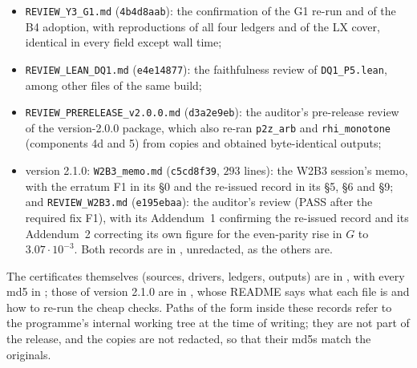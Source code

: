 \documentclass[11pt]{article}
\theoremstyle{definition}
\newcommand{\lean}[1]{\texttt{#1}}
\begin{document}
\begin{itemize}
\item \lean{REVIEW\_\allowbreak{}Y3\_\allowbreak{}G1.md} (\lean{4b4d8aab}): the confirmation of the G1 re-run and of the B4 adoption, with reproductions of all four ledgers and of the LX cover, identical in every field except wall time;
\item \lean{REVIEW\_\allowbreak{}LEAN\_\allowbreak{}DQ1.md} (\lean{e4e14877}): the faithfulness review of \lean{DQ1\_P5.lean}, among other files of the same build;
\item \lean{REVIEW\_\allowbreak{}PRERELEASE\_\allowbreak{}v2.0.0.md} (\lean{d3a2e9eb}): the auditor's pre-release review of the version-2.0.0 package, which also re-ran \lean{p2z\_arb} and \lean{rhi\_monotone} (components 4d and 5) from copies and obtained byte-identical outputs;
\item version 2.1.0: \lean{W2B3\_\allowbreak{}memo.md} (\lean{c5cd8f39}, $293$ lines): the W2B3 session's memo, with the erratum F1 in its \S0 and the re-issued record in its \S5, \S6 and \S9; and \lean{REVIEW\_\allowbreak{}W2B3.md} (\lean{e195ebaa}): the auditor's review (PASS after the required fix F1), with its Addendum~1 confirming the re-issued record and its Addendum~2 correcting its own figure for the even-parity rise in $G$ to $3.07\cdot10^{-3}$. Both records are in , unredacted, as the others are.
\end{itemize}
The certificates themselves (sources, drivers, ledgers, outputs) are in , with every md5 in ; those of version 2.1.0 are in , whose README says what each file is and how to re-run the cheap checks. Paths of the form  inside these records refer to the programme's internal working tree at the time of writing; they are not part of the release, and the copies are not redacted, so that their md5s match the originals.
\end{document}
